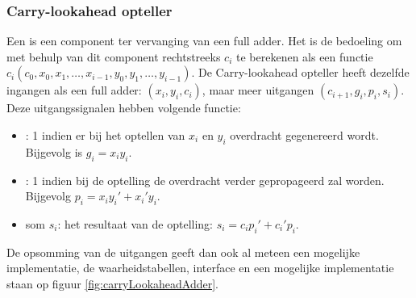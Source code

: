 \subsubsection{Carry-lookahead opteller}
Een  is een component ter vervanging van een full adder. Het is de bedoeling om met behulp van dit component rechtstreeks $c_i$ te berekenen als een functie $c_i\left(c_0,x_0,x_1,\ldots,x_{i-1},y_0,y_1,\ldots,y_{i-1}\right)$. De Carry-lookahead opteller heeft dezelfde ingangen als een full adder: $(x_i,y_i,c_i)$, maar meer uitgangen $(c_{i+1},g_i,p_i,s_i)$. Deze uitgangssignalen hebben volgende functie:
\begin{itemize}
 \item {}: 1 indien er bij het optellen van $x_i$ en $y_i$ overdracht gegenereerd wordt. Bijgevolg is $g_i=x_iy_i$.
 \item {}: 1 indien bij de optelling de overdracht verder gepropageerd zal worden. Bijgevolg $p_i=x_iy_i'+x_i'y_i$.
 \item som $s_i$: het resultaat van de optelling: $s_i=c_ip_i'+c_i'p_i$.
\end{itemize}
De opsomming van de uitgangen geeft dan ook al meteen een mogelijke implementatie, de waarheidstabellen, interface en een mogelijke implementatie staan op figuur \ref{fig:carryLookaheadAdder}.
